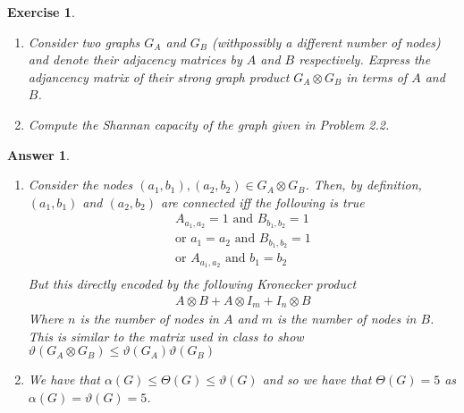 \documentclass[12pt]{article}
\theoremstyle{colon}
\newtheorem{exercise}{Exercise}
\newtheorem*{answer}{Answer}
\begin{document}
\clearpage

\begin{exercise}
  \leavevmode
  \begin{enumerate}[label=\arabic*)]
    \item Consider two graphs $G_A$ and $G_B$ (withpossibly a different number of nodes) and denote their adjacency matrices by $A$ and $B$ respectively. Express the adjancency matrix of their strong graph product $G_A \otimes G_B$ in terms of $A$ and $B$.
    \item Compute the Shannan capacity of the graph given in Problem 2.2.
  \end{enumerate}
\end{exercise}

\begin{answer}
  \leavevmode
  \begin{enumerate}[label=\arabic*)]
    \item Consider the nodes $(a_1, b_1), (a_2, b_2) \in G_A \otimes G_B$. Then, by definition, $(a_1, b_1)$ and $(a_2, b_2)$ are connected iff the following is true
      \begin{gather*}
        A_{a_1, a_2} = 1 \text{ and } B_{b_1, b_2} = 1 \\
        \text{or } a_1 = a_2 \text{ and } B_{b_1, b_2} = 1 \\
        \text{or } A_{a_1, a_2} \text{ and } b_1 = b_2 \\
      \end{gather*}
      But this directly encoded by the following Kronecker product
      \begin{gather*}
        A \otimes B + A \otimes I_m + I_n \otimes B
      \end{gather*}
      Where $n$ is the number of nodes in $A$ and $m$ is the number of nodes in $B$. This is similar to the matrix used in class to show $\vartheta(G_A \otimes G_B) \leq \vartheta(G_A) \vartheta(G_B)$

    \item We have that $\alpha(G) \leq \Theta(G) \leq \vartheta(G)$ and so we have that $\Theta(G) = 5$ as $\alpha(G) = \vartheta(G) = 5$.
  \end{enumerate}
\end{answer}
\end{document}
